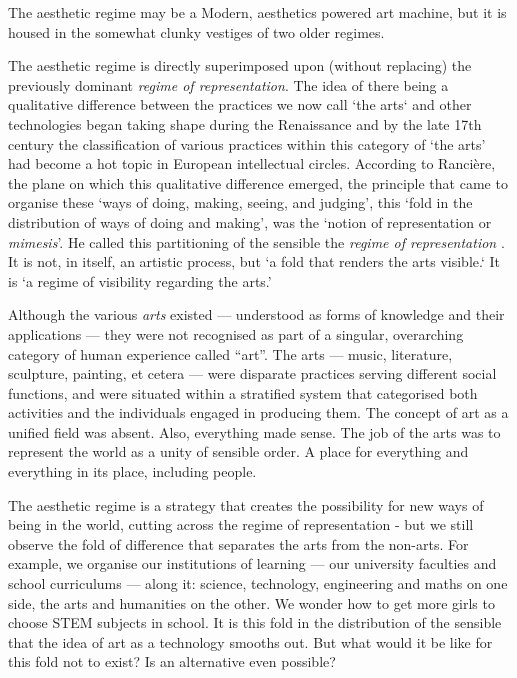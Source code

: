 \documentclass[letterpaper]{article}
\begin{document}
    The aesthetic regime may be a Modern, aesthetics powered art machine, but it is housed in the somewhat clunky vestiges of two older regimes. 
    
    The aesthetic regime is directly superimposed upon (without replacing) the previously dominant \emph{regime of representation}. The idea of there being a qualitative difference between the practices we now call ‘the arts‘ and other technologies began taking shape during the Renaissance \citep[p.136]{TatarkiewiczWhtIsArt1971} and by the late 17th century the classification of various practices within this category of ‘the arts’ had become a hot topic in European intellectual circles. According to Rancière, the plane on which this qualitative difference emerged, the principle that came to organise these ‘ways of doing, making, seeing, and judging’, this ‘fold in the distribution of ways of doing and making’, was the ‘notion of representation or \emph{mimesis}’. He called this partitioning of the sensible the \emph{regime of representation} \citep[p.22]{RancierPltcsOfThAsthtcs2004}. It is not, in itself, an artistic process, but ‘a fold that renders the arts visible.‘ It is  ‘a regime of visibility regarding the arts.’
    
    Although the various \emph{arts} existed — understood as forms of knowledge and their applications — they were not recognised as part of a singular, overarching category of human experience called “art”. The arts — music, literature, sculpture, painting, et cetera — were disparate practices serving different social functions, and were situated within a stratified system that categorised both activities and the individuals engaged in producing them. The concept of art as a unified field was absent. Also, everything made sense. The job of the arts was to represent the world as a unity of sensible order. A place for everything and everything in its place, including people.
    
    The aesthetic regime is a strategy that creates the possibility for new ways of being in the world, cutting across the regime of representation - but we still observe the fold of difference that separates the arts from the non-arts. For example, we organise our institutions of learning — our university faculties and school curriculums — along it: science, technology, engineering and maths on one side, the arts and humanities on the other. We wonder how to get more girls to choose STEM subjects in school. It is this fold in the distribution of the sensible that the idea of art as a technology smooths out. But what would it be like for this fold not to exist? Is an alternative even possible?
\end{document}
